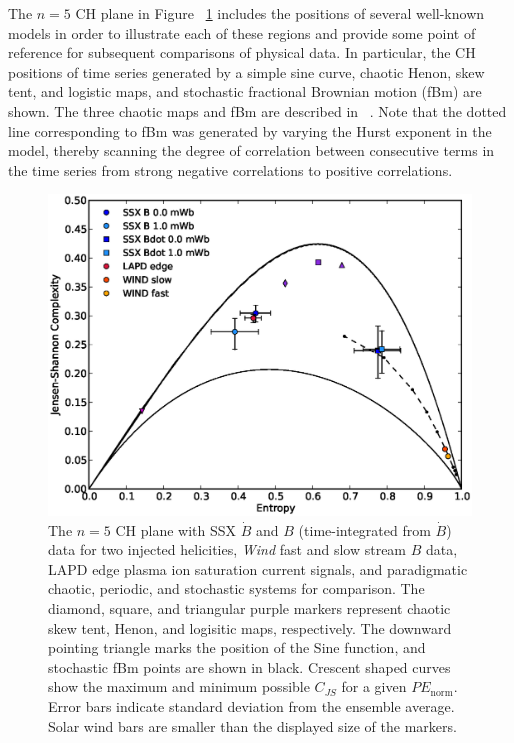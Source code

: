 \documentclass[aps,prx,twocolumn,secnumarabic,nobalancelastpage,amsmath,amssymb,
nofootinbib]{revtex4-1}
\begin{document}
The $n=5$ CH plane in Figure ~\ref{fig:CHplane} includes the positions of several well-known models in order to illustrate each of these regions and provide some point of reference for subsequent comparisons of physical data. In particular, the CH positions of time series generated by a simple sine curve, chaotic Henon, skew tent, and logistic maps, and stochastic fractional Brownian motion (fBm) are shown. The three chaotic maps and fBm are described in ~\cite{rosso2007}. Note that the dotted line corresponding to fBm was generated by varying the Hurst exponent in the model, thereby scanning the degree of correlation between consecutive terms in the time series from strong negative correlations to positive correlations.
%
\begin{figure}[!htb]
\centerline{
\includegraphics[width=15cm]{figure1.eps}}
\caption{\label{fig:CHplane} The $n=5$ CH plane  with SSX $\dot{B}$ and $B$ (time-integrated from $\dot{B}$) data for two injected helicities, \textit{Wind} fast and slow stream $B$ data, LAPD edge plasma ion saturation current signals, and paradigmatic chaotic, periodic, and stochastic systems for comparison. The diamond, square, and triangular purple markers represent chaotic skew tent, Henon, and logisitic maps, respectively. The downward pointing triangle marks the position of the Sine function, and stochastic fBm points are shown in black. Crescent shaped curves show the maximum and minimum possible $C_{JS}$ for a given $PE_{\text{norm}}$. Error bars indicate standard deviation from the ensemble average. Solar wind bars are smaller than the displayed size of the markers.}
\end{figure}
\end{document}
